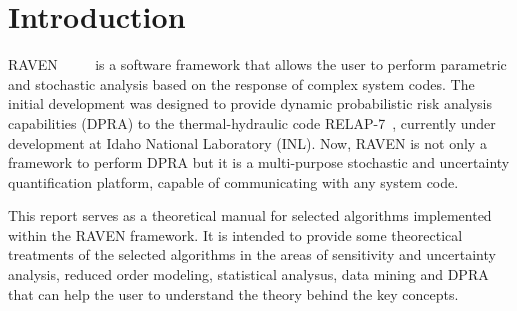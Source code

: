 \section{Introduction}
RAVEN~\cite{alfonsiMC} ~\cite{alfonsiPSA}~\cite{RAVENFY13}~\cite{ESREL2014} is a software framework that allows the user to perform parametric and stochastic
analysis based on the response of complex system codes.
The initial development was designed to provide dynamic probabilistic risk analysis
capabilities (DPRA) to the thermal-hydraulic code RELAP-7~\cite{relap7FY12}, currently under development
at Idaho National Laboratory (INL).
Now, RAVEN is not only a framework to perform DPRA but it is a
multi-purpose stochastic and uncertainty quantification platform, capable of communicating with any system code.

This report serves as a theoretical manual for selected algorithms implemented within the RAVEN framework. 
It is intended to provide some theorectical treatments of the selected algorithms in the areas of sensitivity
and uncertainty analysis, reduced order modeling, statistical analysus, data mining and DPRA that can help the
user to understand the theory behind the key concepts.

